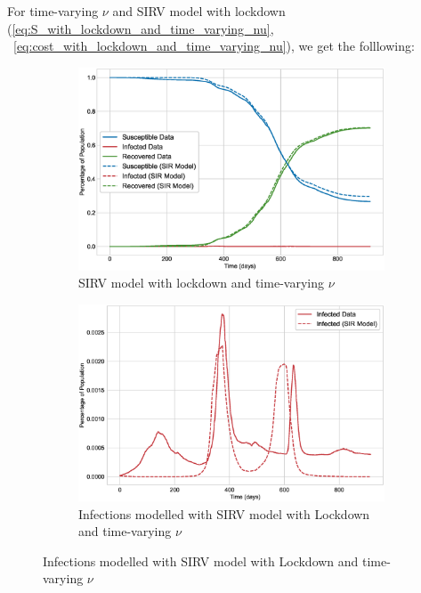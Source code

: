 \documentclass[tikz,fleqn,12pt]{wlscirep}
\begin{document}
For time-varying $\nu$ and SIRV model with lockdown (\ref{eq:S_with_lockdown_and_time_varying_nu}, ~\ref{eq:cost_with_lockdown_and_time_varying_nu}), we get the folllowing:
\begin{figure}[H]
  \centering
  \caption{SIRV Model with lockdown and time-varying $\nu$ for India}

  \begin{subfigure}[t]{\textwidth}
    \centering
    \includegraphics[scale=0.50]{images/SIRV_model_with_lockdown_time_varying_nu_IND.eps}
    \caption{SIRV model with lockdown and time-varying $\nu$}
    \label{fig:SIRV_model_with_lockdown_time_varying_nu_IND}
  \end{subfigure}

  \begin{subfigure}[t]{\textwidth}
    \centering
    \includegraphics[scale=0.50]{images/SIRV_model_with_lockdown_infections_time_varying_nu_IND.eps}
    \caption{Infections modelled with SIRV model with Lockdown and time-varying $\nu$}
    \label{fig:SIRV_model_with_lockdown_infections_time_varying_nu_IND}
  \end{subfigure}
\end{figure}
\end{document}
